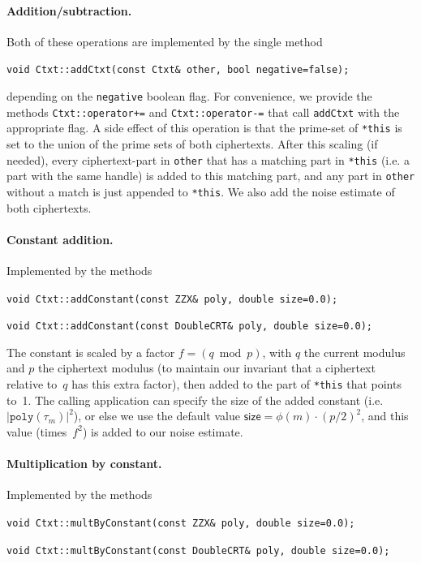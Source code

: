 \documentclass[14pt]{extarticle}
\begin{document}
\paragraph{Addition/subtraction.} Both of these operations are
implemented by the single method

\texttt{void Ctxt::addCtxt(const Ctxt\& other, bool negative=false);}

\noindent
depending on the \texttt{negative} boolean flag. 
For convenience,
we provide the methods \texttt{Ctxt::operator+=} and
\texttt{Ctxt::operator-=} that call \texttt{addCtxt} with the
appropriate flag. A side effect of this
operation is that the prime-set of \texttt{*this} is set to the union
of the prime sets of both ciphertexts. After this scaling (if needed),
every ciphertext-part in \texttt{other} that has a matching part in
\texttt{*this} (i.e. a part with the same handle) is added to this
matching part, and any part in \texttt{other} without a match is just
appended to \texttt{*this}.
We also add the noise estimate of both ciphertexts. 


\paragraph{Constant addition.} Implemented by the methods

\texttt{void Ctxt::addConstant(const ZZX\& poly, double size=0.0);}

\texttt{void Ctxt::addConstant(const DoubleCRT\& poly, double size=0.0);}

\noindent
The constant is scaled by a factor $f=(q \bmod p)$, with $q$ the
current modulus and $p$ the ciphertext modulus (to maintain our
invariant that a ciphertext relative to~$q$ has this extra factor),
then added to the part of \texttt{*this} that points to~1.
The calling application can specify the size of the added constant
(i.e. $|\texttt{poly}(\tau_m)|^2$), or else we use the default value 
$\mathsf{size}=\phi(m)\cdot(p/2)^2$, and this value (times~$f^2$) is
added to our noise estimate.


\paragraph{Multiplication by constant.} Implemented by the methods

  \texttt{void Ctxt::multByConstant(const ZZX\& poly, double size=0.0);}

  \texttt{void Ctxt::multByConstant(const DoubleCRT\& poly, double size=0.0);}
\end{document}
